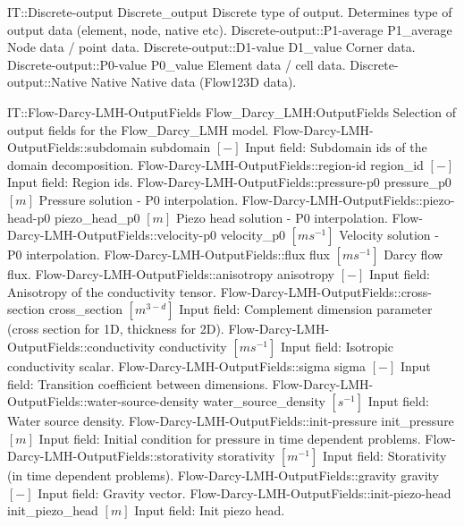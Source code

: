 \begin{SelectionType}
	{IT::Discrete-output}
	{Discrete{\_}output}
	{{{Discrete type of output.
Determines type of output data (element, node, native etc).}%
}}
		\SelectionItem
			{Discrete-output::P1-average}
			{P1{\_}average}
			{{{Node data / point data.}%
}}
		\SelectionItem
			{Discrete-output::D1-value}
			{D1{\_}value}
			{{{Corner data.}%
}}
		\SelectionItem
			{Discrete-output::P0-value}
			{P0{\_}value}
			{{{Element data / cell data.}%
}}
		\SelectionItem
			{Discrete-output::Native}
			{Native}
			{{{Native data (Flow123D data).}%
}}
\end{SelectionType}
\begin{SelectionType}
	{IT::Flow-Darcy-LMH-OutputFields}
	{Flow{\_}Darcy{\_}LMH:OutputFields}
	{{{Selection of output fields for the Flow{\_}Darcy{\_}LMH model.}%
}}
		\SelectionItem
			{Flow-Darcy-LMH-OutputFields::subdomain}
			{subdomain}
			{{{}{$[-]$}{ Input field: Subdomain ids of the domain decomposition.}%
}}
		\SelectionItem
			{Flow-Darcy-LMH-OutputFields::region-id}
			{region{\_}id}
			{{{}{$[-]$}{ Input field: Region ids.}%
}}
		\SelectionItem
			{Flow-Darcy-LMH-OutputFields::pressure-p0}
			{pressure{\_}p0}
			{{{}{$[m]$}{ Pressure solution - P0 interpolation.}%
}}
		\SelectionItem
			{Flow-Darcy-LMH-OutputFields::piezo-head-p0}
			{piezo{\_}head{\_}p0}
			{{{}{$[m]$}{ Piezo head solution - P0 interpolation.}%
}}
		\SelectionItem
			{Flow-Darcy-LMH-OutputFields::velocity-p0}
			{velocity{\_}p0}
			{{{}{$[ms^{-1}]$}{ Velocity solution - P0 interpolation.}%
}}
		\SelectionItem
			{Flow-Darcy-LMH-OutputFields::flux}
			{flux}
			{{{}{$[ms^{-1}]$}{ Darcy flow flux.}%
}}
		\SelectionItem
			{Flow-Darcy-LMH-OutputFields::anisotropy}
			{anisotropy}
			{{{}{$[-]$}{ Input field: Anisotropy of the conductivity tensor.}%
}}
		\SelectionItem
			{Flow-Darcy-LMH-OutputFields::cross-section}
			{cross{\_}section}
			{{{}{$[m^{3-d}]$}{ Input field: Complement dimension parameter (cross section for 1D, thickness for 2D).}%
}}
		\SelectionItem
			{Flow-Darcy-LMH-OutputFields::conductivity}
			{conductivity}
			{{{}{$[ms^{-1}]$}{ Input field: Isotropic conductivity scalar.}%
}}
		\SelectionItem
			{Flow-Darcy-LMH-OutputFields::sigma}
			{sigma}
			{{{}{$[-]$}{ Input field: Transition coefficient between dimensions.}%
}}
		\SelectionItem
			{Flow-Darcy-LMH-OutputFields::water-source-density}
			{water{\_}source{\_}density}
			{{{}{$[s^{-1}]$}{ Input field: Water source density.}%
}}
		\SelectionItem
			{Flow-Darcy-LMH-OutputFields::init-pressure}
			{init{\_}pressure}
			{{{}{$[m]$}{ Input field: Initial condition for pressure in time dependent problems.}%
}}
		\SelectionItem
			{Flow-Darcy-LMH-OutputFields::storativity}
			{storativity}
			{{{}{$[m^{-1}]$}{ Input field: Storativity (in time dependent problems).}%
}}
		\SelectionItem
			{Flow-Darcy-LMH-OutputFields::gravity}
			{gravity}
			{{{}{$[-]$}{ Input field: Gravity vector.}%
}}
		\SelectionItem
			{Flow-Darcy-LMH-OutputFields::init-piezo-head}
			{init{\_}piezo{\_}head}
			{{{}{$[m]$}{ Input field: Init piezo head.}%
}}
\end{SelectionType}
